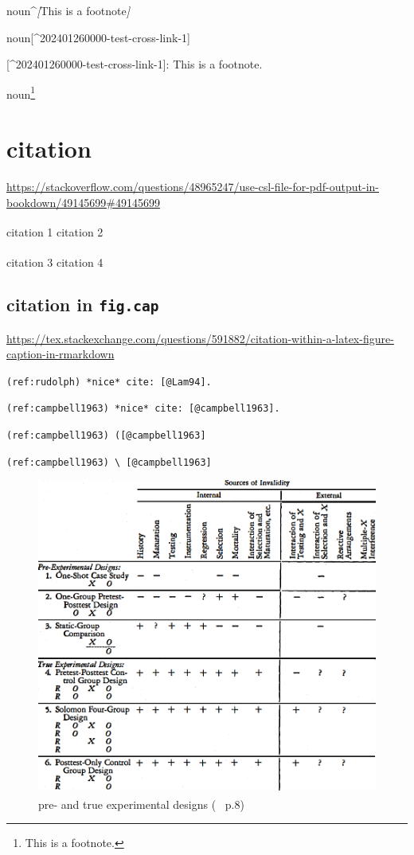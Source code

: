 \documentclass[
]{book}
\newenvironment{Shaded}{\begin{snugshade}}{\end{snugshade}}
\newcommand{\CommentTok}[1]{\textcolor[rgb]{0.56,0.35,0.01}{\textit{#1}}}
\newcommand{\NormalTok}[1]{#1}
\newcommand{\OtherTok}[1]{\textcolor[rgb]{0.56,0.35,0.01}{#1}}
\theoremstyle{definition}
\theoremstyle{definition}
\theoremstyle{definition}
\theoremstyle{definition}
\theoremstyle{remark}
\begin{document}
\begin{Shaded}
\begin{Highlighting}[]
\NormalTok{noun\^{}}\CommentTok{[}\OtherTok{This is a footnote}\CommentTok{]}

\NormalTok{noun}\OtherTok{[\^{}202401260000{-}test{-}cross{-}link{-}1]}

\OtherTok{[\^{}202401260000{-}test{-}cross{-}link{-}1]: }\NormalTok{This is a footnote.}
\end{Highlighting}
\end{Shaded}

noun\footnote{This is a footnote.}

\section{citation}\label{citation}

\url{https://stackoverflow.com/questions/48965247/use-csl-file-for-pdf-output-in-bookdown/49145699\#49145699}

citation 1\textsuperscript{} citation 2\textsuperscript{}

citation 3\textsuperscript{} citation 4\textsuperscript{}

\subsection{\texorpdfstring{citation in \texttt{fig.cap}}{citation in fig.cap}}\label{citation-in-fig.cap}

\url{https://tex.stackexchange.com/questions/591882/citation-within-a-latex-figure-caption-in-rmarkdown}

\texttt{(ref:rudolph)\ *nice*\ cite:\ {[}@Lam94{]}.}

\texttt{(ref:campbell1963)\ *nice*\ cite:\ {[}@campbell1963{]}.}

\texttt{(ref:campbell1963)\ ({[}@campbell1963{]}}

\texttt{(ref:campbell1963)\ \textbackslash{}\ {[}@campbell1963{]}}



\begin{figure}
\includegraphics[width=0.65\linewidth]{img/pre-and-true-experimental-designs} \caption{pre- and true experimental designs (~\textsuperscript{} p.8)}\label{fig:unnamed-chunk-52}
\end{figure}
\end{document}

